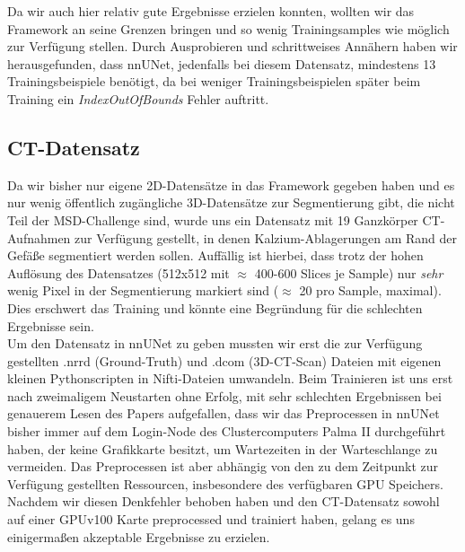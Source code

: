 Da wir auch hier relativ gute Ergebnisse erzielen konnten, wollten wir das Framework an seine Grenzen bringen und so wenig Trainingsamples wie möglich zur Verfügung stellen. Durch Ausprobieren und schrittweises Annähern haben wir herausgefunden, dass nnUNet, jedenfalls bei diesem Datensatz, mindestens 13 Trainingsbeispiele benötigt, da bei weniger Trainingsbeispielen später beim Training ein \textit{IndexOutOfBounds} Fehler auftritt.


\subsection{CT-Datensatz}
Da wir bisher nur eigene 2D-Datensätze in das Framework gegeben haben und es nur wenig öffentlich zugängliche 3D-Datensätze zur Segmentierung gibt, die nicht Teil der MSD-Challenge \cite{msdChallenge} sind, wurde uns ein Datensatz mit 19 Ganzkörper CT-Aufnahmen zur Verfügung gestellt, in denen Kalzium-Ablagerungen am Rand der Gefäße segmentiert werden sollen.
Auffällig ist hierbei, dass trotz der hohen Auflösung des Datensatzes (512x512 mit $\approx$ 400-600 Slices je Sample) nur \textit{sehr} wenig Pixel in der Segmentierung markiert sind ($\approx$ 20 pro Sample, maximal). Dies erschwert das Training und könnte eine Begründung für die  schlechten Ergebnisse sein.\\
Um den Datensatz in nnUNet zu geben mussten wir erst die zur Verfügung gestellten .nrrd (Ground-Truth) und .dcom (3D-CT-Scan) Dateien mit eigenen kleinen Pythonscripten \cite{autoMLGithub} in Nifti-Dateien umwandeln. Beim Trainieren ist uns erst nach zweimaligem Neustarten ohne Erfolg, mit sehr schlechten Ergebnissen bei genauerem Lesen des Papers aufgefallen, dass wir das Preprocessen in nnUNet bisher immer auf dem Login-Node des Clustercomputers Palma II durchgeführt haben, der keine Grafikkarte besitzt, um Wartezeiten in der Warteschlange zu vermeiden. Das Preprocessen ist aber abhängig von den zu dem Zeitpunkt zur Verfügung gestellten Ressourcen, insbesondere des verfügbaren GPU Speichers. Nachdem wir diesen Denkfehler behoben haben und den CT-Datensatz sowohl auf einer GPUv100 Karte preprocessed und trainiert haben, gelang es uns  einigermaßen akzeptable Ergebnisse zu erzielen. 

